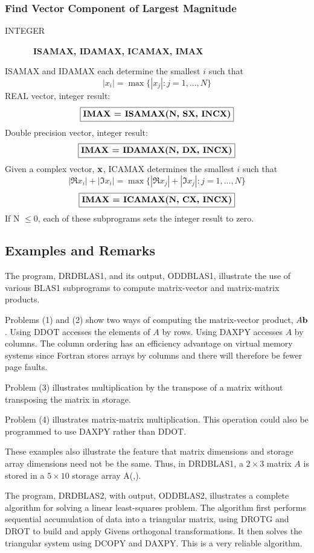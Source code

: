 \documentclass[twoside]{MATH77}
\begin{document}
\subsubsection{Find Vector Component of Largest Magnitude\label{B13}}
\begin{description}
\item[INTEGER]  \ {\bf ISAMAX, IDAMAX, ICAMAX, IMAX }
\end{description}
ISAMAX and IDAMAX each determine the smallest $i$ such that%
\begin{equation*}
|x_i|=\max \{|x_j|:j=1,...,N\}
\end{equation*}
REAL vector, integer result:
$$
\fbox{{\bf IMAX = ISAMAX(N, SX, INCX)}}
$$
Double precision vector, integer result:
$$
\fbox{{\bf IMAX = IDAMAX(N, DX, INCX)}}
$$
Given a complex vector, ${\bf x}$, ICAMAX determines the smallest $i$ such
that%
\begin{equation*}
|\Re x_i|+|\Im x_i|=\max \{|\Re x_j|+|\Im x_j|:j=1,...,N\}
\end{equation*}
$$
\fbox{{\bf IMAX = ICAMAX(N, CX, INCX)}}
$$
If N $\leq 0$, each of these subprograms sets the integer result to zero.

\subsection{Examples and Remarks}

The program, DRDBLAS1, and its output, ODDBLAS1, illustrate the use of
various BLAS1 subprograms to compute matrix-vector and matrix-matrix products.

Problems (1) and (2) show two ways of computing the matrix-vector
product, $A{\bf b}$. Using DDOT accesses the elements of $A$ by rows.
Using DAXPY accesses $A$ by columns. The column ordering has an
efficiency advantage on virtual memory systems since Fortran stores
arrays by columns and there will therefore be fewer page faults.

Problem (3) illustrates multiplication by the transpose of a matrix without
transposing the matrix in storage.

Problem (4) illustrates matrix-matrix multiplication. This operation could
also be programmed to use DAXPY rather than DDOT.

These examples also illustrate the feature that matrix dimensions and
storage array dimensions need not be the same. Thus, in DRDBLAS1, a $2\times
3$ matrix $A$ is stored in a $5\times 10$ storage array A(,).

The program, DRDBLAS2, with output, ODDBLAS2, illustrates a complete
algorithm for solving a linear least-squares problem. The algorithm first
performs sequential accumulation of data into a triangular matrix, using
DROTG and DROT to build and apply Givens orthogonal transformations. It then
solves the triangular system using DCOPY and DAXPY. This is a very reliable
algorithm.
\end{document}

